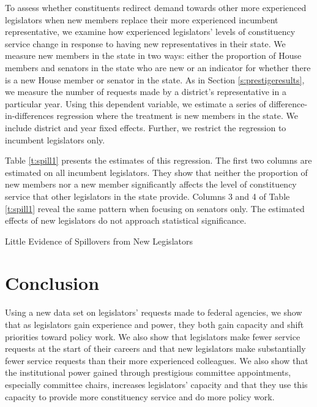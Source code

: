 \documentclass[12pt]{article}
\begin{document}
To assess whether constituents redirect demand towards other more experienced legislators when new members replace their more experienced incumbent representative, we examine how experienced legislators' levels of constituency service change in response to having new representatives in their state. We measure new members in the state in two ways: either the proportion of House members and senators in the state who are new or an indicator for whether there is a new House member or senator in the state. As in Section \ref{s:prestigeresults}, we measure the number of requests made by a district's representative in a particular year. Using this dependent variable, we estimate a series of difference-in-differences regression where the treatment is new members in the state. We include district and year fixed effects. Further, we restrict the regression to incumbent legislators only.   

Table \ref{t:spill1} presents the estimates of this regression. The first two columns are estimated on all incumbent legislators. They show that neither the proportion of new members nor a new member significantly affects the level of constituency service that other legislators in the state provide. Columns 3 and 4 of Table \ref{t:spill1} reveal the same pattern when focusing on senators only. The estimated effects of new legislators do not approach statistical significance.  

   

\begin{table}[hbt!]
\caption{Little Evidence of Spillovers from New Legislators} \label{t:spill1}

\begin{minipage}{\textwidth}
\begin{center}

\end{center}
\end{minipage}
\end{table}


\section{Conclusion} \label{s:conclude}
Using a new data set on legislators' requests made to federal agencies, we show that as legislators gain experience and power, they both gain capacity and shift priorities toward policy work. We also show that legislators make fewer service requests at the start of their careers and that new legislators make substantially fewer service requests than their more experienced colleagues. We also show that the institutional power gained through prestigious committee appointments, especially committee chairs, increases legislators' capacity and that they use this capacity to provide more constituency service and do more policy work.
\end{document}
